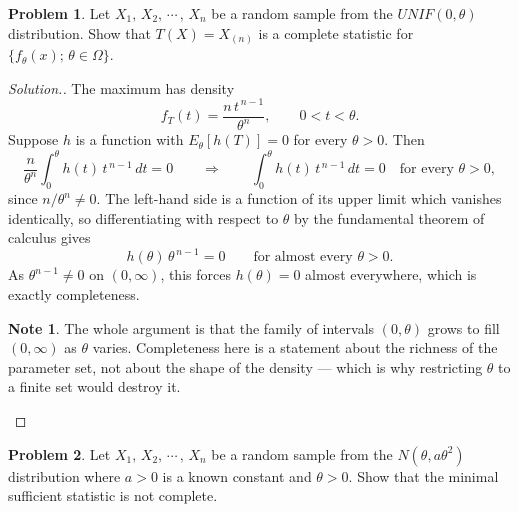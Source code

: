 \documentclass[12pt,a4paper]{report}
\theoremstyle{definition}
\newtheorem*{note}{Note}
\newtheorem{problemx}{Problem}[section]
\newenvironment{problem}{\begin{problemx}}{\end{problemx}}
\newenvironment{solution}
  {\renewcommand{\qedsymbol}{}\begin{proof}[\textit{Solution}.]}
  {\end{proof}}
\begin{document}
\begin{problem}
\label{prob:uniformcomplete}
Let $X_1, \, X_2, \, \cdots\, , \, X_n$ be a random sample from the $UNIF(0,\theta)$ distribution. Show that $T(X) = X_{(n)}$ is a complete statistic for $\{f_{\theta}(x);\, \theta \in \Omega\}$.
\end{problem}

\begin{solution}
The maximum has density
\[f_T(t) = \frac{n\,t^{\,n-1}}{\theta^{n}},\qquad 0<t<\theta .\]
Suppose $h$ is a function with $E_{\theta}\left[h(T)\right]=0$ for every
$\theta>0$. Then
\[\frac{n}{\theta^{n}}\int_0^{\theta} h(t)\,t^{\,n-1}\,dt = 0
\qquad\Longrightarrow\qquad \int_0^{\theta} h(t)\,t^{\,n-1}\,dt = 0
\quad\text{for every }\theta>0 ,\]
since $n/\theta^{n}\neq 0$. The left-hand side is a function of its upper limit
which vanishes identically, so differentiating with respect to $\theta$ by the
fundamental theorem of calculus gives
\[h(\theta)\,\theta^{\,n-1} = 0 \qquad\text{for almost every }\theta>0 .\]
As $\theta^{n-1}\neq0$ on $(0,\infty)$, this forces $h(\theta)=0$ almost
everywhere, which is exactly completeness.

\begin{note}
The whole argument is that the family of intervals $(0,\theta)$ grows to fill
$(0,\infty)$ as $\theta$ varies. Completeness here is a statement about the
richness of the parameter set, not about the shape of the density --- which is
why restricting $\theta$ to a finite set would destroy it.
\end{note}
\end{solution}

\begin{problem}
\label{prob:normalaminimal}
Let $X_1, \, X_2, \, \cdots\, , \, X_n$ be a random sample from the $N(\theta, a\theta^2)$ distribution where $a>0$ is a known constant and $\theta >0$. Show that the minimal sufficient statistic is not complete.
\end{problem}
\end{document}
